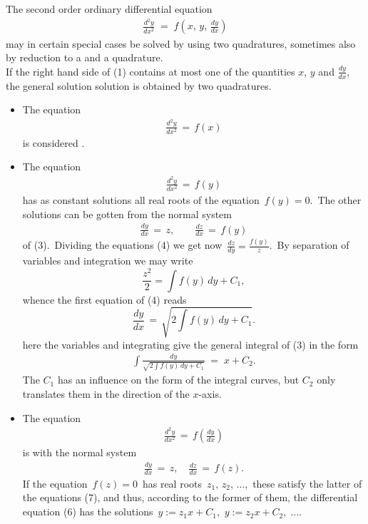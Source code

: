 \documentclass[12pt]{article}
\theoremstyle{definition}
\begin{document}
The second order ordinary differential equation
\begin{align}
\frac{d^2y}{dx^2} \;=\; f\!\left(x,\,y,\,\frac{dy}{dx}\right)
\end{align}
may in certain special cases be solved by using two quadratures, sometimes also by reduction to a  and a quadrature.\\

If the right hand side of (1) contains at most one of the quantities $x$, $y$ and $\frac{dy}{dx}$, the general solution solution is obtained by two quadratures.\\

\begin{itemize}

\item The equation
\begin{align}
\frac{d^2y}{dx^2} \,=\, f(x)
\end{align}
is considered .\\

\item The equation
\begin{align}
\frac{d^2y}{dx^2} \,=\, f(y)
\end{align}
has as constant solutions all real roots of the equation \,$f(y) = 0$.\, The other solutions can be gotten from the normal system 
\begin{align}
\frac{dy}{dx} \,=\, z, \qquad \frac{dz}{dx} \,=\, f(y)
\end{align}
of (3).\, Dividing the equations (4) we get now\, $\frac{dz}{dy} = \frac{f(y)}{z}$.\, By separation of variables and integration we may write
$$\frac{z^2}{2} = \int\!f(y)\,dy +C_1,$$
whence the first equation of (4) reads
$$\frac{dy}{dx} \,=\, \sqrt{2\!\int\!f(y)\,dy+C_1}.$$
 here the variables and integrating give the general integral of (3) in the form
\begin{align}
\int\!\frac{dy}{\sqrt{2\!\int\!f(y)\,dy+C_1}} \;=\; x+C_2.
\end{align}
The  $C_1$ has an influence on the form of the integral curves, but $C_2$ only translates them in the direction of the $x$-axis.\\

\item The equation
\begin{align}
\frac{d^2y}{dx^2} \,=\, f(\frac{dy}{dx})
\end{align}
is  with the normal system
\begin{align}
\frac{dy}{dx} \,=\, z, \quad \frac{dz}{dx} \,=\, f(z).
\end{align}
If the equation\, $f(z) = 0$\,  has real roots\, $z_1,\,z_2,\,\ldots$,\, these satisfy the latter of the equations (7), and thus, according to the former of them, the differential equation (6) has the solutions\, $y := z_1x+C_1$,\, $y := z_2x+C_2,\;\ldots$.


\end{itemize}
\end{document}
